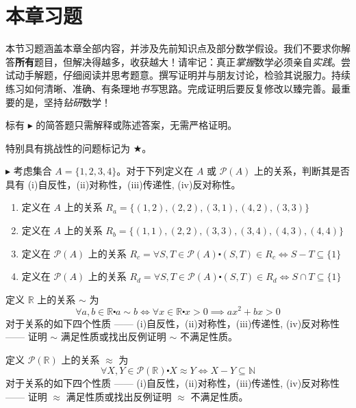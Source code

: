 \section{本章习题}

本节习题涵盖本章全部内容，并涉及先前知识点及部分数学假设。我们不要求你解答\textbf{所有}题目，但解决得越多，收获越大！请牢记：真正\emph{掌握}数学必须亲自\emph{实践}。尝试动手解题，仔细阅读并思考题意。撰写证明并与朋友讨论，检验其说服力。持续练习如何清晰、准确、有条理地\emph{书写}思路。完成证明后要反复修改以臻完善。最重要的是，坚持\emph{钻研}数学！

标有 $\blacktriangleright$ 的简答题只需解释或陈述答案，无需严格证明。

特别具有挑战性的问题标记为 $\bigstar$。\\

\begin{exercise}
    $\blacktriangleright$ 考虑集合 $A = \{1, 2, 3, 4\}$。对于下列定义在 $A$ 或 $\mathcal{P}(A)$ 上的关系，判断其是否具有 (i)自反性，(ii)对称性，(iii)传递性, (iv)反对称性。
    \begin{enumerate}[label=(\alph*)]
        \item 定义在 $A$ 上的关系 $R_a= \{ (1, 2),(2, 2),(3, 1),(4, 2),(3, 3) \}$
        \item 定义在 $A$ 上的关系 $R_b= \{  (1, 1),(2, 2),(3, 3),(3, 4),(4, 3),(4, 4) \}$
        \item 定义在 $\mathcal{P}(A)$ 上的关系 $R_c= \forall S, T \in \mathcal{P}(A) \centerdot (S, T) \in R_c \iff S - T \subseteq \{1\}$
        \item 定义在 $\mathcal{P}(A)$ 上的关系 $R_d= \forall S, T \in \mathcal{P}(A) \centerdot (S, T) \in R_d \iff S \cap T \subseteq \{1\}$
    \end{enumerate}
\end{exercise}

\begin{exercise}
    定义 $\mathbb{R}$ 上的关系 $\sim$ 为
    \[\forall a, b \in \mathbb{R} \centerdot a \sim b \iff  \forall x \in \mathbb{R} \centerdot x > 0 \implies ax^2 + bx > 0\]
    对于关系的如下四个性质 —— (i)自反性，(ii)对称性，(iii)传递性, (iv)反对称性 —— 证明 $\sim$ 满足性质或找出反例证明 $\sim$ 不满足性质。
\end{exercise}

\begin{exercise}
    定义 $\mathcal{P}(\mathbb{R})$ 上的关系 $\approx$ 为
    \[\forall X, Y \in \mathcal{P}(\mathbb{R}) \centerdot X \approx Y \iff X - Y \subseteq \mathbb{N}\]
    对于关系的如下四个性质 —— (i)自反性，(ii)对称性，(iii)传递性, (iv)反对称性 —— 证明 $\approx$ 满足性质或找出反例证明 $\approx$ 不满足性质。
\end{exercise}

